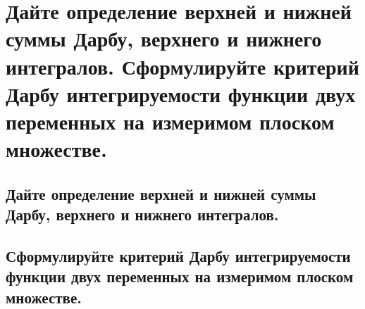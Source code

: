 \section{Дайте определение верхней и нижней суммы Дарбу, верхнего и нижнего  интегралов. Сформулируйте критерий Дарбу интегрируемости функции двух переменных на измеримом плоском множестве.}

\subsection{Дайте определение верхней и нижней суммы Дарбу, верхнего и нижнего  интегралов.}

\subsection{Сформулируйте критерий Дарбу интегрируемости функции двух переменных на измеримом плоском множестве.}